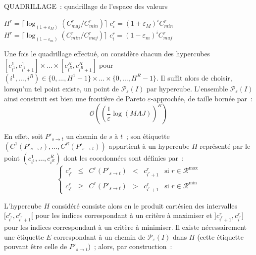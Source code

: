 \documentclass[10pt,francais]{llncs}
\begin{document}
{\begin{algorithm}\label{algo-quadrillage}
\caption{QUADRILLAGE~: quadrillage de l'espace des valeurs}
\Entree{$I$ instance, $\varepsilon_M,\varepsilon_m\in]0,1[$ erreurs pour les crit\`eres \`a maximiser / minimiser}
\BlankLine
{}
\BlankLine
{}
{
	$H^r = \lceil \log_{(1+\varepsilon_M)}\left(C^r_{maj}/C^r_{min}\right)\rceil$\;
	{
		$c^r_{i} = (1+\varepsilon_M)^iC^r_{min}$\;
	}
}
{
	$H^r = \lceil \log_{(1-\varepsilon_m)}\left(C^r_{min}/C^r_{maj}\right)\rceil$\;
	{
		$c^r_{i} = (1-\varepsilon_m)^iC^r_{maj}$\;
	}
}
\end{algorithm}

Une fois le quadrillage effectu\'e, on consid\`ere chacun des hypercubes $[c^1_{i^1},c^1_{i^1+1}]\times\ldots\times[c^R_{i^R},c^R_{i^R+1}]$ pour $(i^1,\ldots,i^R)\in \{0,\ldots,H^1-1\}\times\ldots\times\{0,\ldots,H^R-1\}$. Il suffit alors de choisir, lorsqu'un tel point existe, un point de $\mathscr{P}_\varepsilon(I)$ par hypercube. L'ensemble $\mathscr{P}_\varepsilon(I)$ ainsi construit est bien une fronti\`ere de Pareto $\varepsilon$-approch\'ee, de taille born\'ee par~:
$$\mathcal{O}\left(\left(\frac{1}{\varepsilon}\log(MAJ)\right)^R\right)$$

En effet, soit $P'_{s \to t}$ un chemin de $s$ \`a $t$~; son \'etiquette $\left(C^1(P'_{s \to t}),\ldots,C^R(P'_{s \to t})\right)$ appartient \`a un hypercube $H$ repr\'esent\'e par le point $\left(c^1_{i^1},\ldots,c^R_{i^R}\right)$ dont les coordonn\'ees sont d\'efinies par~: 
$$\left\{\begin{array}{lclclc}
			c^r_{i^r} 	&\leq &C^r(P'_{s \to t}) &< &c^{r}_{i^r+1} 	&\textrm{si } r\in \mathscr{R}^{\max}\\[7pt]
			c^r_{i^r} 	&\geq &C^r(P'_{s \to t}) &> &c^{r}_{i^r+1} 	&\textrm{si } r\in \mathscr{R}^{\min}
	\end{array}\right.$$

L'hypercube $H$ consid\'er\'e consiste alors en le produit cart\'esien des intervalles $[c^r_{i^r},c^{r}_{i^r+1}[$ pour les indices correspondant \`a un crit\`ere \`a maximiser et $]c^r_{i^r+1},c^{r}_{i^{r}}]$ pour les indices correspondant \`a un crit\`ere \`a minimiser. Il existe n\'ecessairement une \'etiquette $E$ correspondant \`a un chemin de $\mathscr{P}_\varepsilon(I)$ dans $H$ (cette \'etiquette pouvant \^{e}tre celle de $P'_{s \to t}$)~; alors, par construction~:

}
\end{document}
